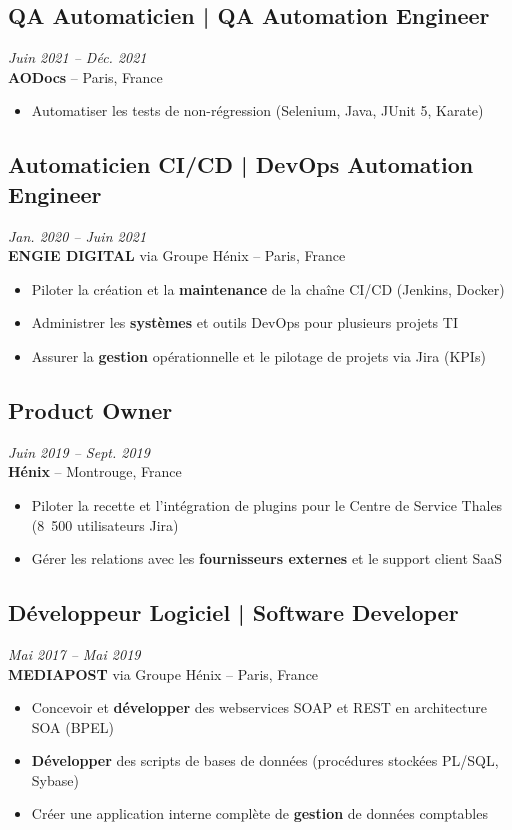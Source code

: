 \documentclass[11pt,a4paper]{article}
\newcommand{\highlight}[1]{\textbf{#1}}
\begin{document}
\subsection*{QA Automaticien | QA Automation Engineer} \hfill \textit{Juin 2021 -- D\'{e}c. 2021}\\
\textbf{AODocs} -- Paris, France
\begin{itemize}
    \item Automatiser les tests de non-r\'{e}gression (Selenium, Java, JUnit 5, Karate)
\end{itemize}

\subsection*{Automaticien CI/CD | DevOps Automation Engineer} \hfill \textit{Jan. 2020 -- Juin 2021}\\
\textbf{ENGIE DIGITAL} via Groupe H\'{e}nix -- Paris, France
\begin{itemize}
    \item Piloter la cr\'{e}ation et la \highlight{maintenance} de la cha\^{i}ne CI/CD (Jenkins, Docker)
    \item Administrer les \highlight{syst\`{e}mes} et outils DevOps pour plusieurs projets TI
    \item Assurer la \highlight{gestion} op\'{e}rationnelle et le pilotage de projets via Jira (KPIs)
\end{itemize}

\subsection*{Product Owner} \hfill \textit{Juin 2019 -- Sept. 2019}\\
\textbf{H\'{e}nix} -- Montrouge, France
\begin{itemize}
    \item Piloter la recette et l'int\'{e}gration de plugins pour le Centre de Service Thales (8~500 utilisateurs Jira)
    \item G\'{e}rer les relations avec les \highlight{fournisseurs externes} et le support client SaaS
\end{itemize}

\subsection*{D\'{e}veloppeur Logiciel | Software Developer} \hfill \textit{Mai 2017 -- Mai 2019}\\
\textbf{MEDIAPOST} via Groupe H\'{e}nix -- Paris, France
\begin{itemize}
    \item Concevoir et \highlight{d\'{e}velopper} des webservices SOAP et REST en architecture SOA (BPEL)
    \item \highlight{D\'{e}velopper} des scripts de bases de donn\'{e}es (proc\'{e}dures stock\'{e}es PL/SQL, Sybase)
    \item Cr\'{e}er une application interne compl\`{e}te de \highlight{gestion} de donn\'{e}es comptables
\end{itemize}
\end{document}
